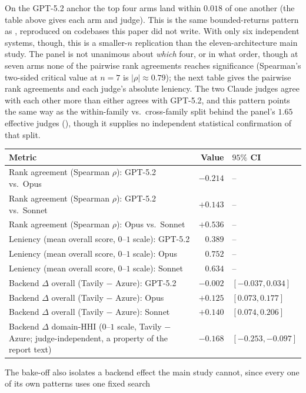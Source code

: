 \documentclass[11pt]{article}
\begin{document}
On the GPT-5.2 anchor the top four arms land within $0.018$ of one another (the table
above gives each arm and judge). This is the same bounded-returns pattern as
, reproduced on codebases this paper did not write. With only six
independent systems, though, this is a smaller-$n$ replication than the
eleven-architecture main study. The panel is not unanimous about \emph{which} four, or
in what order, though at seven arms none of the pairwise rank agreements reaches
significance (Spearman's two-sided critical value at $n=7$ is $|\rho|\approx0.79$); the
next table gives the pairwise rank agreements and each judge's absolute leniency. The
two Claude judges agree with each other more than either agrees with GPT-5.2, and this
pattern points the same way as the within-family vs.\ cross-family split behind the
panel's $1.65$ effective judges (), though it supplies no independent
statistical confirmation of that split.
\begin{center}
\small
\begin{tabular}{lrl}
\toprule
Metric & Value & $95\%$ CI \\
\midrule
Rank agreement (Spearman $\rho$): GPT-5.2 vs.\ Opus & $-0.214$ & -- \\
Rank agreement (Spearman $\rho$): GPT-5.2 vs.\ Sonnet & $+0.143$ & -- \\
Rank agreement (Spearman $\rho$): Opus vs.\ Sonnet & $+0.536$ & -- \\
Leniency (mean overall score, $0$--$1$ scale): GPT-5.2 & $0.389$ & -- \\
Leniency (mean overall score, $0$--$1$ scale): Opus & $0.752$ & -- \\
Leniency (mean overall score, $0$--$1$ scale): Sonnet & $0.634$ & -- \\
Backend $\Delta$ overall (Tavily $-$ Azure): GPT-5.2 & $-0.002$ & $[-0.037, 0.034]$ \\
Backend $\Delta$ overall (Tavily $-$ Azure): Opus & $+0.125$ & $[0.073, 0.177]$ \\
Backend $\Delta$ overall (Tavily $-$ Azure): Sonnet & $+0.140$ & $[0.074, 0.206]$ \\
Backend $\Delta$ domain-HHI ($0$--$1$ scale, Tavily $-$ Azure; judge-independent, a property of the report text) & $-0.168$ & $[-0.253, -0.097]$ \\
\bottomrule
\end{tabular}
\end{center}
The bake-off also isolates a backend
effect the main study cannot, since every one of its own patterns uses one fixed search
\end{document}
